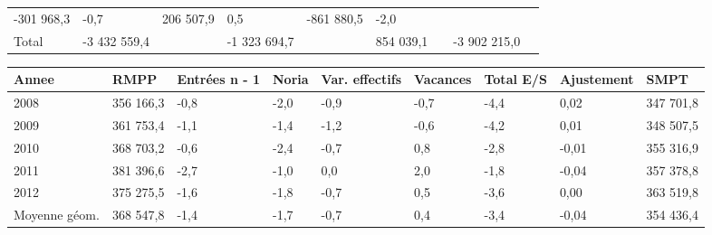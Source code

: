 \begin{longtable}[]{@{}lllllllll@{}}
\begin{minipage}[t]{0.16\columnwidth}
-301 968,3\strut
\end{minipage} & \begin{minipage}[t]{0.06\columnwidth}\raggedright
-0,7\strut
\end{minipage} & \begin{minipage}[t]{0.12\columnwidth}\raggedright
206 507,9\strut
\end{minipage} & \begin{minipage}[t]{0.06\columnwidth}\raggedright
0,5\strut
\end{minipage} & \begin{minipage}[t]{0.10\columnwidth}\raggedright
-861 880,5\strut
\end{minipage} & \begin{minipage}[t]{0.06\columnwidth}\raggedright
-2,0\strut
\end{minipage}\tabularnewline
\begin{minipage}[t]{0.05\columnwidth}\raggedright
Total\strut
\end{minipage} & \begin{minipage}[t]{0.10\columnwidth}\raggedright
-3 432 559,4\strut
\end{minipage} & \begin{minipage}[t]{0.06\columnwidth}\raggedright
\strut
\end{minipage} & \begin{minipage}[t]{0.16\columnwidth}\raggedright
-1 323 694,7\strut
\end{minipage} & \begin{minipage}[t]{0.06\columnwidth}\raggedright
\strut
\end{minipage} & \begin{minipage}[t]{0.12\columnwidth}\raggedright
854 039,1\strut
\end{minipage} & \begin{minipage}[t]{0.06\columnwidth}\raggedright
\strut
\end{minipage} & \begin{minipage}[t]{0.10\columnwidth}\raggedright
-3 902 215,0\strut
\end{minipage} & \begin{minipage}[t]{0.06\columnwidth}\raggedright
\strut
\end{minipage}\tabularnewline
\bottomrule
\end{longtable}

\begin{longtable}[]{@{}lllllllll@{}}
\toprule
Annee & RMPP & Entrées n - 1 & Noria & Var. effectifs & Vacances & Total
E/S & Ajustement & SMPT\tabularnewline
\midrule
\endhead
2008 & 356 166,3 & -0,8 & -2,0 & -0,9 & -0,7 & -4,4 & 0,02 & 347
701,8\tabularnewline
2009 & 361 753,4 & -1,1 & -1,4 & -1,2 & -0,6 & -4,2 & 0,01 & 348
507,5\tabularnewline
2010 & 368 703,2 & -0,6 & -2,4 & -0,7 & 0,8 & -2,8 & -0,01 & 355
316,9\tabularnewline
2011 & 381 396,6 & -2,7 & -1,0 & 0,0 & 2,0 & -1,8 & -0,04 & 357
378,8\tabularnewline
2012 & 375 275,5 & -1,6 & -1,8 & -0,7 & 0,5 & -3,6 & 0,00 & 363
519,8\tabularnewline
Moyenne géom. & 368 547,8 & -1,4 & -1,7 & -0,7 & 0,4 & -3,4 & -0,04 &
354 436,4\tabularnewline
\bottomrule
\end{longtable}

